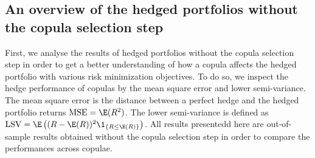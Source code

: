 \subsection{An overview of the hedged portfolios without the copula selection step}\label{subsec:HP1}
First, we analyse the results of hedged portfolios without the copula
selection step in order to get a better understanding of how a copula
affects the hedged portfolio with various risk minimization
objectives.
To do so, we inspect the hedge performance of copulas by
the mean square error and lower semi-variance.
The mean square error
is the distance between a perfect hedge and the hedged portfolio
returns $\operatorname{MSE}= \E(R^2)$.
The lower semi-variance is defined as 
$\operatorname{LSV}=\E \left( (R-\E(R))^2 \1_{\{R\leq \E(R)\}} \right)$.
All results presentedd here are out-of-sample results obtained without
the copula selection step in order to compare the performances across
copulae.


